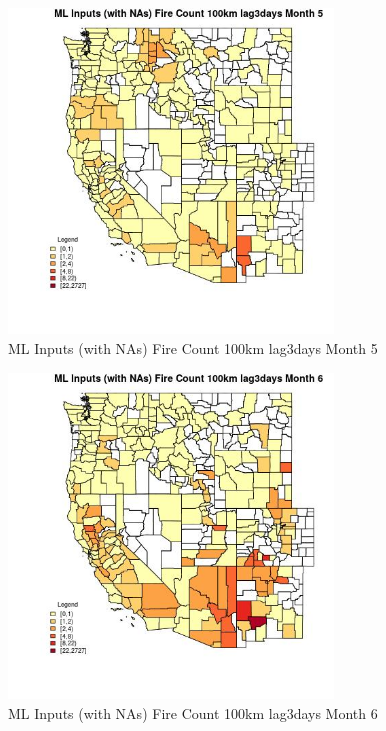 \begin{figure} 
\centering  
\includegraphics[width=0.77\textwidth]{Code_Outputs/Report_ML_input_PM25_Step4_part_f_de_duplicated_aves_prioritize_24hr_obswNAs_CountyFire_Count_100km_lag3daysmedianMonth5.jpg} 
\caption{\label{fig:Report_ML_input_PM25_Step4_part_f_de_duplicated_aves_prioritize_24hr_obswNAsCountyFire_Count_100km_lag3daysmedianMonth5}ML Inputs (with NAs) Fire Count 100km lag3days Month 5} 
\end{figure} 
 

\begin{figure} 
\centering  
\includegraphics[width=0.77\textwidth]{Code_Outputs/Report_ML_input_PM25_Step4_part_f_de_duplicated_aves_prioritize_24hr_obswNAs_CountyFire_Count_100km_lag3daysmedianMonth6.jpg} 
\caption{\label{fig:Report_ML_input_PM25_Step4_part_f_de_duplicated_aves_prioritize_24hr_obswNAsCountyFire_Count_100km_lag3daysmedianMonth6}ML Inputs (with NAs) Fire Count 100km lag3days Month 6} 
\end{figure} 
 

